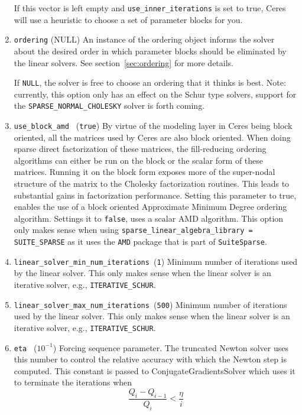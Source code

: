 \begin{enumerate}
  If this vector is left empty and \texttt{use\_inner\_iterations} is
  set to true, Ceres will use a heuristic to choose a set of parameter
  blocks for you.

\item{\texttt{ordering} (NULL)} An instance of the ordering object
  informs the solver about the desired order in which parameter
  blocks should be eliminated by the linear solvers. See
  section~\ref{sec:ordering} for more details.

  If \texttt{NULL}, the solver is free to choose an ordering that it
  thinks is best. Note: currently, this option only has an effect on
  the Schur type solvers, support for the
  \texttt{SPARSE\_NORMAL\_CHOLESKY} solver is forth coming.

\item{\texttt{use\_block\_amd } (\texttt{true})} By virtue of the
  modeling layer in Ceres being block oriented, all the matrices used
  by Ceres are also block oriented.  When doing sparse direct
  factorization of these matrices, the fill-reducing ordering
  algorithms can either be run on the block or the scalar form of
  these matrices. Running it on the block form exposes more of the
  super-nodal structure of the matrix to the Cholesky factorization
  routines. This leads to substantial gains in factorization
  performance. Setting this parameter to true, enables the use of a
  block oriented Approximate Minimum Degree ordering
  algorithm. Settings it to \texttt{false}, uses a scalar AMD
  algorithm. This option only makes sense when using
  \texttt{sparse\_linear\_algebra\_library = SUITE\_SPARSE} as it uses
  the \texttt{AMD} package that is part of \texttt{SuiteSparse}.

\item{\texttt{linear\_solver\_min\_num\_iterations }}(\texttt{1})
  Minimum number of iterations used by the linear solver. This only
  makes sense when the linear solver is an iterative solver, e.g.,
  \texttt{ITERATIVE\_SCHUR}.

\item{\texttt{linear\_solver\_max\_num\_iterations }}(\texttt{500})
  Minimum number of iterations used by the linear solver. This only
  makes sense when the linear solver is an iterative solver, e.g.,
  \texttt{ITERATIVE\_SCHUR}.

\item{\texttt{eta }} ($10^{-1}$)
 Forcing sequence parameter. The truncated Newton solver uses this
 number to control the relative accuracy with which the Newton step is
 computed. This constant is passed to ConjugateGradientsSolver which
 uses it to terminate the iterations when
\begin{equation}
\frac{Q_i - Q_{i-1}}{Q_i} < \frac{\eta}{i}
\end{equation}


\end{enumerate}

